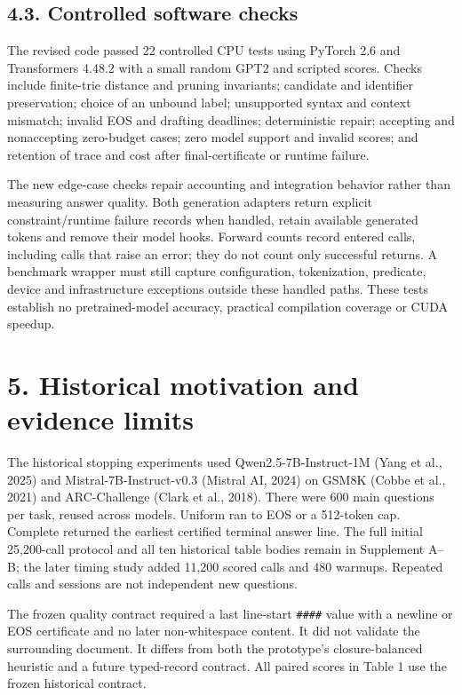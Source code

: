 \documentclass[
  12pt,
  a4paper,
]{article}
\begin{document}
\subsection{4.3. Controlled software
checks}\label{controlled-software-checks}

The revised code passed 22 controlled CPU tests using PyTorch 2.6 and
Transformers 4.48.2 with a small random GPT2 and scripted scores. Checks
include finite-trie distance and pruning invariants; candidate and
identifier preservation; choice of an unbound label; unsupported syntax
and context mismatch; invalid EOS and drafting deadlines; deterministic
repair; accepting and nonaccepting zero-budget cases; zero model support
and invalid scores; and retention of trace and cost after
final-certificate or runtime failure.

The new edge-case checks repair accounting and integration behavior
rather than measuring answer quality. Both generation adapters return
explicit constraint/runtime failure records when handled, retain
available generated tokens and remove their model hooks. Forward counts
record entered calls, including calls that raise an error; they do not
count only successful returns. A benchmark wrapper must still capture
configuration, tokenization, predicate, device and infrastructure
exceptions outside these handled paths. These tests establish no
pretrained-model accuracy, practical compilation coverage or CUDA
speedup.

\section{5. Historical motivation and evidence
limits}\label{historical-motivation-and-evidence-limits}

The historical stopping experiments used Qwen2.5-7B-Instruct-1M (Yang et
al., 2025) and Mistral-7B-Instruct-v0.3 (Mistral AI, 2024) on GSM8K
(Cobbe et al., 2021) and ARC-Challenge (Clark et al., 2018). There were
600 main questions per task, reused across models. Uniform ran to EOS or
a 512-token cap. Complete returned the earliest certified terminal
answer line. The full initial 25,200-call protocol and all ten
historical table bodies remain in Supplement A--B; the later timing
study added 11,200 scored calls and 480 warmups. Repeated calls and
sessions are not independent new questions.

The frozen quality contract required a last line-start \texttt{\#\#\#\#}
value with a newline or EOS certificate and no later non-whitespace
content. It did not validate the surrounding document. It differs from
both the prototype's closure-balanced heuristic and a future
typed-record contract. All paired scores in Table 1 use the frozen
historical contract.
\end{document}
